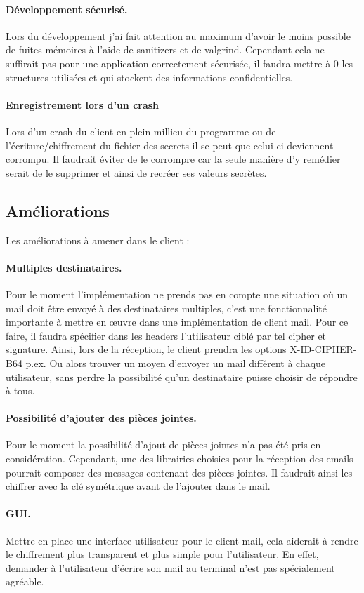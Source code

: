 \paragraph*{Développement sécurisé.}
Lors du développement j'ai fait attention au maximum d'avoir le moins possible de fuites mémoires à l'aide de sanitizers et de valgrind. Cependant cela ne suffirait pas pour une application correctement sécurisée, il faudra mettre à 0 les structures utilisées et qui stockent des informations confidentielles.
\paragraph*{Enregistrement lors d'un crash}
Lors d'un crash du client en plein millieu du programme ou de l'écriture/chiffrement du fichier des secrets il se peut que celui-ci deviennent corrompu. Il faudrait éviter de le corrompre car la seule manière d'y remédier serait de le supprimer et ainsi de recréer ses valeurs secrètes.
\subsection{Améliorations}
Les améliorations à amener dans le client :
\paragraph*{Multiples destinataires.}
Pour le moment l'implémentation ne prends pas en compte une situation où un mail doit être envoyé à des destinataires multiples, c'est une fonctionnalité importante à mettre en œuvre dans une implémentation de client mail. Pour ce faire, il faudra spécifier dans les headers l'utilisateur ciblé par tel cipher et signature. Ainsi, lors de la réception, le client prendra les options X-ID-CIPHER-B64 p.ex. Ou alors trouver un moyen d'envoyer un mail différent à chaque utilisateur, sans perdre la possibilité qu'un destinataire puisse choisir de répondre à tous.
\paragraph*{Possibilité d'ajouter des pièces jointes.}
Pour le moment la possibilité d'ajout de pièces jointes n'a pas été pris en considération. Cependant, une des librairies choisies pour la réception des emails pourrait composer des messages contenant des pièces jointes. Il faudrait ainsi les chiffrer avec la clé symétrique avant de l'ajouter dans le mail.
\paragraph*{GUI.}
Mettre en place une interface utilisateur pour le client mail, cela aiderait à rendre le chiffrement plus transparent et plus simple pour l'utilisateur. En effet, demander à l'utilisateur d'écrire son mail au terminal n'est pas spécialement agréable.
